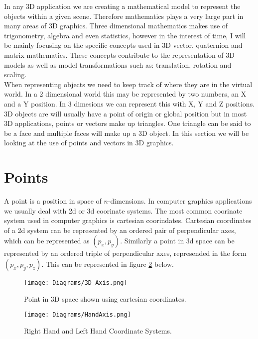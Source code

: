 \lettrine[lines=3]{I}{}n any 3D application we are creating a mathematical model to represent the objects within a given scene. Therefore mathematics plays a very large part in many areas of 3D graphics. Three dimensional mathematics makes use of trigonometry, algebra and even statistics, however in the interest of time, I will be mainly focusing on the specific concepts used in 3D vector, quaternion and matrix mathematics. These concepts contribute to the representation of 3D models as well as model transformations such as: translation, rotation and scaling. \\

When representing objects we need to keep track of where they are in the virtual world. In a 2 dimensional world this may be represented by two numbers, an X and a Y position. In 3 dimesions we can represent this with X, Y and Z positions. 3D objects are will usually have a point of origin or global position but in most 3D applications, points or vectors make up triangles. One triangle can be said to be a face and multiple faces will make up a 3D object. In this section we will be looking at the use of points and vectors in 3D graphics.

\section{Points} 

A point is a position in space of $n$-dimensions. In computer graphics applications we usually deal with \acrshort{2d} or \acrshort{3d} coorinate systems. The most common coorinate system used in computer graphics is cartesian coorindates. Cartesian coordinates of a \acrshort{2d} system can be represented by an ordered pair of perpendicular axes, which can be represented as $(p_x, p_y)$. Similarly a point in \acrshort{3d} space can be represented by an ordered triple of perpendicular axes, represended in the form $(p_x, p_y, p_z)$. This can be represented in figure \ref{3DAxisFigure} below.

\begin{figure}[htbp]
	\raggedright
	{\centering
		\vspace{7px}
		\texttt{[image: Diagrams/3D\_Axis.png]}
		\caption{Point in 3D space shown using cartesian coordinates.}
		\label{3DAxisFigure}
	}
\end{figure}
\FloatBarrier

\begin{figure}[htbp]
	\raggedright
	{\centering
		\vspace{7px}
		\texttt{[image: Diagrams/HandAxis.png]}
		\caption{Right Hand and Left Hand Coordinate Systems.}
		\label{3DAxisFigure}
	}
\end{figure}
\FloatBarrier

